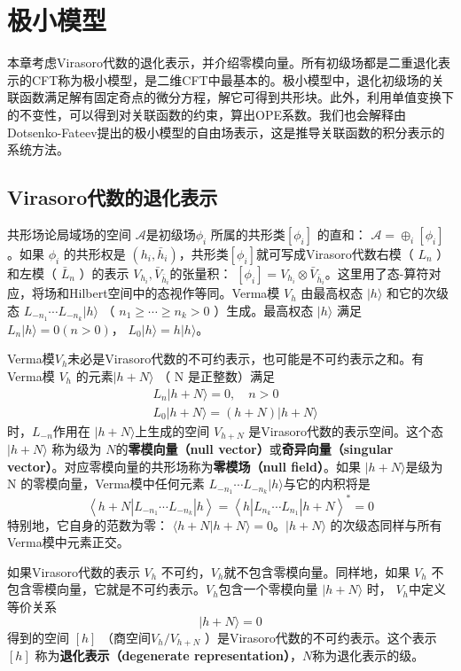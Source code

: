 \chapter{极小模型}
本章考虑Virasoro代数的退化表示，并介绍零模向量。所有初级场都是二重退化表示的CFT称为极小模型，是二维CFT中最基本的。极小模型中，退化初级场的关联函数满足解有固定奇点的微分方程，解它可得到共形块。此外，利用单值变换下的不变性，可以得到对关联函数的约束，算出OPE系数。我们也会解释由Dotsenko-Fateev提出的极小模型的自由场表示，这是推导关联函数的积分表示的系统方法。

\section{Virasoro代数的退化表示}
共形场论局域场的空间 $\mathcal{A} $是初级场$ \phi_i$ 所属的共形类$ [\phi_i]$ 的直和： $\mathcal{A}=\oplus_{i}\left[\phi_{i}\right]$ 。如果 $\phi_i$ 的共形权是 $(h_i,\bar{h}_i) $，共形类$ [\phi_i] $就可写成Virasoro代数右模（ $L_n$ ）和左模（ $\bar{L}_n$ ）的表示 $V_{h_{i}}, \bar{V}_{\bar{h}_{i}} $的张量积： $\left[\phi_{i}\right]=V_{h_{i}} \otimes \bar{V}_{\bar{h}_{i}} $。这里用了态-算符对应，将场和Hilbert空间中的态视作等同。Verma模 $V_h$ 由最高权态 $|h\rangle$ 和它的次级态 $L_{-n_{1}} \cdots L_{-n_{k}}|h\rangle$ （ $n_{1} \geq \cdots \geq n_{k}>0$ ）生成。最高权态 $|h\rangle$ 满足 $L_{n}|h\rangle=0(n>0) $， $L_{0}|h\rangle=h|h\rangle $。

Verma模$ V_h $未必是Virasoro代数的不可约表示，也可能是不可约表示之和。有Verma模 $V_h$ 的元素$ |h+N\rangle$ （ N 是正整数）满足
\begin{align} &L_{n}|h+N\rangle=0, \quad n>0 \\ &L_{0}|h+N\rangle=(h+N)|h+N\rangle \end{align}
时，$ L_{-n} $作用在 $|h+N\rangle $上生成的空间 $V_{h+N}$ 是Virasoro代数的表示空间。这个态$ |h+N\rangle$ 称为级为 $N $的\textbf{零模向量（null vector）}或\textbf{奇异向量（singular vector）}。对应零模向量的共形场称为\textbf{零模场（null field）}。如果 $|h+N\rangle $是级为 N 的零模向量，Verma模中任何元素 $L_{-n_{1}} \cdots L_{-n_{k}}|h\rangle $与它的内积将是
\begin{equation}
	\left\langle h+N\left|L_{-n_{1}} \cdots L_{-n_{k}}\right| h\right\rangle=\left\langle h\left|L_{n_{k}} \cdots L_{n_{1}}\right| h+N\right\rangle^{*}=0
\end{equation}
特别地，它自身的范数为零： $\langle h+N | h+N\rangle=0 $。$ |h+N\rangle$ 的次级态同样与所有Verma模中元素正交。

如果Virasoro代数的表示 $V_h$ 不可约，$ V_h $就不包含零模向量。同样地，如果 $V_h$ 不包含零模向量，它就是不可约表示。$ V_h $包含一个零模向量 $|h+N\rangle$ 时， $V_h $中定义等价关系
\begin{equation}
	|h+N\rangle=0
\end{equation}
得到的空间 $[h]$ （商空间$ V_h/V_{h+N}$ ）是Virasoro代数的不可约表示。这个表示 $[h]$ 称为\textbf{退化表示（degenerate representation）}，$ N $称为退化表示的级。

